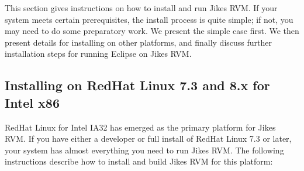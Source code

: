 This section gives instructions on how to install and run Jikes RVM.
If your system meets certain prerequisites, the install process is
quite simple; if not, you may need to do some preparatory work.  We
present the simple case first.  We then present details for installing
on other platforms, and finally discuss further installation steps for
running Eclipse on Jikes RVM.

\subsection{Installing on RedHat Linux 7.3 and 8.x for Intel x86}

RedHat Linux for Intel IA32 has emerged as the 
primary platform for Jikes RVM. 
If you have either a developer or full install of RedHat
Linux 7.3 or later, your system has almost everything you need
to run Jikes RVM.  The following instructions describe how to install
and build Jikes RVM for this platform:
